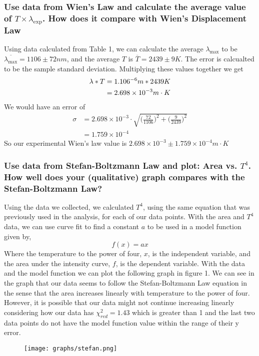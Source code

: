 \documentclass{article}
\begin{document}
\subsubsection*{Use data from Wien's Law and calculate the average value of $T\times \lambda_{\exp}$.
How does it compare with Wien's Displacement Law}
Using data calculated from Table 1, we can calculate the average $\lambda_{\max}$
to be $\overline{\lambda_{\max}} = 1106 \pm 72 nm$, and the average $T$ is 
$\overline{T} = 2439 \pm 9 K$.
The error is calcualted to be the sample standard deviation. Multiplying these
values together we get
\begin{align*}
    \lambda * T &= 1.106\time 10^{-6}m * 2439 K\\
    &= 2.698 \times 10^{-3} m\cdot K
\end{align*}
We would have an error of
\begin{align*}
    \sigma &= 2.698 \times 10^{-3} \cdot \sqrt{\big(\frac{72}{1106}\big)^2 + 
    \big(\frac{9}{2439}\big)^2 }\\
    &= 1.759 \times 10^{-4}
\end{align*}
So our experimental Wien's law value is $2.698 \times 10^{-3} \pm 1.759 
\times 10^{-4} m\cdot K$

\subsubsection*{Use data from Stefan-Boltzmann Law and plot: Area vs. $T^4$. How 
well does your (qualitative) graph compares with the Stefan-Boltzmann Law?}
Using the data we collected, we calculated $T^4$, using the same equation that was 
previously used in the analysis, for each of our data points.  With the area and $T^4$
data, we can use curve fit to find a constant $a$ to be used in a model function given by,
\[f(x)=ax\] Where the temperature to the power of four, $x$, is the independent variable, 
and the area under the intensity curve, $f$, is the dependent variable.  With the data and 
the model function we can plot the following graph in figure 1.
We can see in the graph that our data seems to follow the Stefan-Boltzmann Law equation in 
the sense that the area increases linearly with temperature to the power of four.  However,
it is possible that our data might not continue increasing linearly considering how our data
has $\chi^2_{red}=1.43$ which is greater than 1 and the last two data points do not have 
the model function value within the range of their y error.

\begin{figure}
    \centering
    \texttt{[image: graphs/stefan.png]}
    \caption{}
\end{figure}
\end{document}
